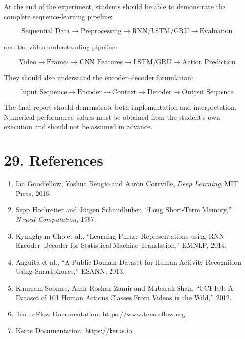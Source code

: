 \documentclass[10pt]{article}
\begin{document}
At the end of the experiment, students should be able to demonstrate the
complete sequence-learning pipeline:

\[
\boxed{
\text{Sequential Data}
\rightarrow
\text{Preprocessing}
\rightarrow
\text{RNN/LSTM/GRU}
\rightarrow
\text{Evaluation}
}
\]

and the video-understanding pipeline:

\[
\boxed{
\text{Video}
\rightarrow
\text{Frames}
\rightarrow
\text{CNN Features}
\rightarrow
\text{LSTM/GRU}
\rightarrow
\text{Action Prediction}
}
\]

They should also understand the encoder--decoder formulation:

\[
\boxed{
\text{Input Sequence}
\rightarrow
\text{Encoder}
\rightarrow
\text{Context}
\rightarrow
\text{Decoder}
\rightarrow
\text{Output Sequence}
}
\]

The final report should demonstrate both implementation and interpretation.
Numerical performance values must be obtained from the student's own
execution and should not be assumed in advance.

\section*{29. References}

\begin{enumerate}
\item Ian Goodfellow, Yoshua Bengio and Aaron Courville,
\emph{Deep Learning}, MIT Press, 2016.

\item Sepp Hochreiter and Jürgen Schmidhuber,
``Long Short-Term Memory,'' \emph{Neural Computation}, 1997.

\item Kyunghyun Cho et al.,
``Learning Phrase Representations using RNN Encoder--Decoder for Statistical
Machine Translation,'' EMNLP, 2014.

\item Anguita et al.,
``A Public Domain Dataset for Human Activity Recognition Using Smartphones,''
ESANN, 2013.

\item Khurram Soomro, Amir Roshan Zamir and Mubarak Shah,
``UCF101: A Dataset of 101 Human Actions Classes From Videos in the Wild,''
2012.

\item TensorFlow Documentation:
\url{https://www.tensorflow.org}

\item Keras Documentation:
\url{https://keras.io}
\end{enumerate}
\end{document}
